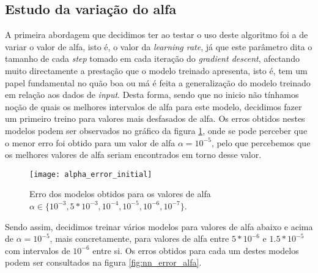 \subsection{Estudo da variação do alfa}
\label{sec:sub_study_nn_alfa}
A primeira abordagem que decidimos ter ao testar o uso deste algoritmo foi a de variar o valor de alfa, isto é, o valor da \textit{learning rate}, já que este parâmetro dita o tamanho de cada \textit{step} tomado em cada iteração do \textit{gradient descent}, afectando muito directamente a prestação que o modelo treinado apresenta, isto é, tem um papel fundamental no quão boa ou má é feita a generalização do modelo treinado em relação aos dados de \textit{input}.
Desta forma, sendo que no inicio não tínhamos noção de quais os melhores intervalos de alfa para este modelo, decidimos fazer um primeiro treino para valores mais desfasados de alfa. Os erros obtidos nestes modelos podem ser observados no gráfico da figura \ref{fig:nn_initial_error_alfa}, onde se pode perceber que o menor erro foi obtido para um valor de alfa $\alpha = 10^{-5}$, pelo que percebemos que os melhores valores de alfa seriam encontrados em torno desse valor.

\begin{figure}[!t]
\centering
\texttt{[image: alpha\_error\_initial]}
\caption{Erro dos modelos obtidos para os valores de alfa $\alpha \in \{10^{-3}, 5*10^{-3}, 10^{-4}, 10^{-5}, 10^{-6}, 10^{-7}\}$.}
\label{fig:nn_initial_error_alfa}
\end{figure}
Sendo assim, decidimos treinar vários modelos para valores de alfa abaixo e acima de $\alpha = 10^{-5}$, mais concretamente, para valores de alfa entre $5*10^{-6}$ e $1.5*10^{-5}$ com intervalos de $10^{-6}$ entre si. Os erros  obtidos para cada um destes modelos podem ser consultados na figura \ref{fig:nn_error_alfa}.

